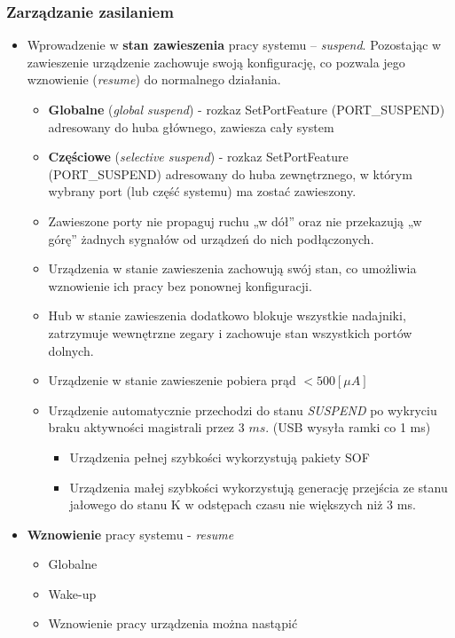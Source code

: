 	\subsubsection{Zarządzanie zasilaniem}
	\begin{itemize}
		\item Wprowadzenie w \textbf{stan zawieszenia} pracy systemu – \emph{suspend}. Pozostając w zawieszenie urządzenie zachowuje swoją konfigurację, co pozwala jego wznowienie (\emph{resume}) do normalnego działania.
		\begin{itemize}
			\item \textbf{Globalne} (\emph{global suspend}) - rozkaz SetPortFeature (PORT\_SUSPEND) adresowany do huba głównego, zawiesza cały system
			\item \textbf{Częściowe} (\emph{selective suspend}) - rozkaz SetPortFeature (PORT\_SUSPEND) adresowany do huba zewnętrznego, w którym wybrany port (lub część systemu) ma zostać zawieszony.
			\item Zawieszone porty nie propaguj ruchu „w dół” oraz nie przekazują „w górę” żadnych sygnałów od urządzeń do nich podłączonych.
			\item Urządzenia w stanie zawieszenia zachowują swój stan, co umożliwia wznowienie ich pracy bez ponownej konfiguracji.
			\item Hub w stanie zawieszenia dodatkowo blokuje wszystkie nadajniki, zatrzymuje wewnętrzne zegary i zachowuje stan wszystkich portów dolnych.
			\item Urządzenie w stanie zawieszenie pobiera prąd $< 500 [\mu A]$
			\item Urządzenie automatycznie przechodzi do stanu \emph{SUSPEND} po wykryciu braku aktywności magistrali przez 3 $ms$. (USB wysyła ramki co 1 ms)
			\begin{itemize}
				\item Urządzenia pełnej szybkości wykorzystują pakiety SOF
				\item Urządzenia małej szybkości wykorzystują generację przejścia ze stanu jałowego do stanu K w odstępach czasu nie większych niż 3 ms.
			\end{itemize}
		\end{itemize}
		\item \textbf{Wznowienie} pracy systemu - \emph{resume}
		\begin{itemize}
			\item Globalne
			\item Wake-up
			\item Wznowienie pracy urządzenia można nastąpić

\end{itemize}
\end{itemize}
